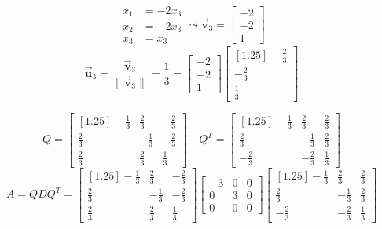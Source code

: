 \documentclass[letter,11pt]{article}
\theoremstyle{definition}
\begin{document}
\begin{tcolorbox}[boxrule=1mm, width=(\linewidth),before=\hfill,after=\hfill,adjusted title={Problem 3 Solutions}]
\begin{minipage}{0.333\textwidth}
            $$\begin{aligned}
                 x_{1} &= -2x_{3}\\
                    x_{2} &= -2x_{3}\\
                    x_{3}&=x_{3}
        \end{aligned} \leadsto \vec{\boldsymbol{v}}_3 = \begin{bmatrix}-2\\-2\\1\end{bmatrix}$$
         $$\vec{\boldsymbol{u}}_{3} = \frac{\vec{\boldsymbol{v}}_{3}}{\|\vec{\boldsymbol{v}}_{3}\|} =\frac{1}{3}=\begin{bmatrix}-2\\-2\\1\end{bmatrix} \begin{bmatrix}[1.25] -\frac{2}{3}\\ -\frac{2}{3} \\ \frac{1}{3}\end{bmatrix}$$
         \end{minipage}
         $$Q = \begin{bmatrix}[1.25]
            -\frac{1}{3} & \frac{2}{3} & -\frac{2}{3} \\
            \frac{2}{3} & -\frac{1}{3} & -\frac{2}{3} \\
            \frac{2}{3} & \frac{2}{3} & \frac{1}{3}
            \end{bmatrix} \quad Q^{T} = \begin{bmatrix}[1.25]
            -\frac{1}{3} & \frac{2}{3} & \frac{2}{3} \\
            \frac{2}{3} & -\frac{1}{3} & \frac{2}{3} \\
            -\frac{2}{3} & -\frac{2}{3} & \frac{1}{3}
            \end{bmatrix}$$
            $$A=QDQ^{T}=\boxed{\begin{bmatrix}[1.25]
            -\frac{1}{3} & \frac{2}{3} & -\frac{2}{3} \\
            \frac{2}{3} & -\frac{1}{3} & -\frac{2}{3} \\
            \frac{2}{3} & \frac{2}{3} & \frac{1}{3}
            \end{bmatrix} \begin{bmatrix} -3 & 0 & 0 \\ 0 & 3 & 0\\ 0 & 0 & 0\end{bmatrix}\begin{bmatrix}[1.25]
            -\frac{1}{3} & \frac{2}{3} & \frac{2}{3} \\
            \frac{2}{3} & -\frac{1}{3} & \frac{2}{3} \\
            -\frac{2}{3} & -\frac{2}{3} & \frac{1}{3}
            \end{bmatrix}}$$

\end{tcolorbox}
\newpage
\end{document}
